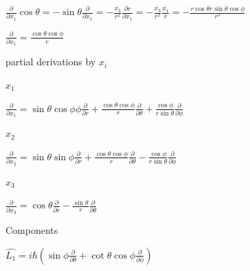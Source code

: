 \documentclass[11pt,a4paper]{scrartcl}
\begin{document}
\begin{enumerate}
\begin{calculationbox}
\begin{calculationbox}
\begin{calculationbox}
                            $\frac{\partial}{\partial x_1} \cos\theta 
                            = -\sin\theta \frac{\partial}{\partial x_1} 
                            = -\frac{x_3}{r^2} \frac{\partial r}{\partial x_1}
                            = -\frac{x_3}{r^2} \frac{x_1}{r}
                            =  -\frac{r \cos\theta r \sin\theta \cos\phi}{r^3}
                            $

                            $\frac{\partial}{\partial x_1} = \frac{\cos\theta \cos \phi}{r}$
                        \end{calculationbox}
                    \end{calculationbox}

                    partial derivations by $x_i$
                    \begin{calculationbox}
                        $x_1$
                        \begin{calculationbox}
                            $\frac{\partial}{\partial x_1} 
                            = \sin\theta\cos\phi\phi \frac{\partial}{\partial r} 
                            + \frac{\cos \theta \cos \phi}{r} \frac{\partial}{\partial \theta}
                            +\frac{\cos\phi}{r \sin\theta} \frac{\partial}{\partial \phi}$
                        \end{calculationbox} 

                        $x_2$
                        \begin{calculationbox}
                            $\frac{\partial}{\partial x_2}
                            = \sin\theta\sin\phi \frac{\partial}{\partial r}
                            + \frac{\cos\theta\cos\phi}{r} \frac{\partial}{\partial \theta} 
                            - \frac{\cos\phi}{r \sin\theta} \frac{\partial}{\partial \phi}
                            $
                        \end{calculationbox}

                        $x_3$
                        \begin{calculationbox}
                            $\frac{\partial}{\partial x_3} 
                            = \cos\theta \frac{\partial}{\partial r} - \frac{\sin \theta}{ r} \frac{\partial}{\partial \theta}
                            $
                        \end{calculationbox}
                    \end{calculationbox}

                    Components 
                    \begin{calculationbox}
                        $\hat{L_1} = i\hbar
                        (\sin\phi \frac{\partial}{\partial \theta} 
                        + \cot\theta \cos \phi \frac{\partial}{\partial \phi})$


\end{calculationbox}
\end{calculationbox}
\end{enumerate}
\end{document}
